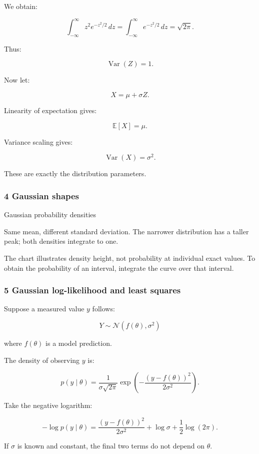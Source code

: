 We obtain:

\[
 \int_{-\infty}^{\infty}z^2e^{-z^2/2}\,dz = \int_{-\infty}^{\infty}e^{-z^2/2}\,dz =\sqrt{2\pi}.
\]

Thus:

\[
 \boxed{\operatorname{Var}(Z)=1}.
\]

Now let:

\[
 X=\mu+\sigma Z.
\]

Linearity of expectation gives:

\[
 \mathbb E[X]=\mu.
\]

Variance scaling gives:

\[
 \operatorname{Var}(X)=\sigma^2.
\]

These are exactly the distribution parameters.

\subsubsection{4 Gaussian shapes}\label{02-foundations-ii-ch023-gaussian-shapes}

Gaussian probability densities

Same mean, different standard deviation. The narrower distribution has a taller peak; both densities integrate to one.

The chart illustrates density height, not probability at individual exact values. To obtain the probability of an interval, integrate the curve over that interval.

\subsubsection{5 Gaussian log-likelihood and least squares}\label{02-foundations-ii-ch023-gaussian-log-likelihood-and-least-squares}

Suppose a measured value \(y\) follows:

\[
 Y\sim\mathcal N(f(\theta),\sigma^2)
\]

where \(f(\theta)\) is a model prediction.

The density of observing \(y\) is:

\[
 p(y\mid\theta) = \frac1{\sigma\sqrt{2\pi}} \exp\left( -\frac{(y-f(\theta))^2}{2\sigma^2} \right).
\]

Take the negative logarithm:

\[
 -\log p(y\mid\theta) = \frac{(y-f(\theta))^2}{2\sigma^2} +\log\sigma+\frac12\log(2\pi).
\]

If \(\sigma\) is known and constant, the final two terms do not depend on \(\theta\).

